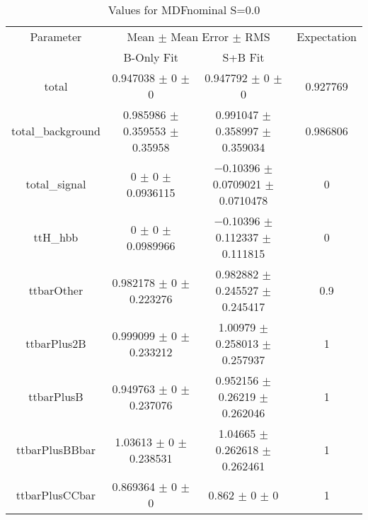 \begin{table}
\centering
\caption{Values for MDFnominal S=0.0}
\begin{tabular}{cccc}
\toprule
Parameter & \multicolumn{2}{c}{Mean $\pm$ Mean Error $\pm$ RMS} & Expectation\\
 & B-Only Fit & S+B Fit & \\
\midrule
total & \num{0.947038} $\pm$ \num{0} $\pm$ \num{0} & \num{0.947792} $\pm$ \num{0} $\pm$ \num{0} & \num{0.927769}\\
total\_background & \num{0.985986} $\pm$ \num{0.359553} $\pm$ \num{0.35958} & \num{0.991047} $\pm$ \num{0.358997} $\pm$ \num{0.359034} & \num{0.986806}\\
total\_signal & \num{0} $\pm$ \num{0} $\pm$ \num{0.0936115} & \num{-0.10396} $\pm$ \num{0.0709021} $\pm$ \num{0.0710478} & \num{0}\\
ttH\_hbb & \num{0} $\pm$ \num{0} $\pm$ \num{0.0989966} & \num{-0.10396} $\pm$ \num{0.112337} $\pm$ \num{0.111815} & \num{0}\\
ttbarOther & \num{0.982178} $\pm$ \num{0} $\pm$ \num{0.223276} & \num{0.982882} $\pm$ \num{0.245527} $\pm$ \num{0.245417} & \num{0.9}\\
ttbarPlus2B & \num{0.999099} $\pm$ \num{0} $\pm$ \num{0.233212} & \num{1.00979} $\pm$ \num{0.258013} $\pm$ \num{0.257937} & \num{1}\\
ttbarPlusB & \num{0.949763} $\pm$ \num{0} $\pm$ \num{0.237076} & \num{0.952156} $\pm$ \num{0.26219} $\pm$ \num{0.262046} & \num{1}\\
ttbarPlusBBbar & \num{1.03613} $\pm$ \num{0} $\pm$ \num{0.238531} & \num{1.04665} $\pm$ \num{0.262618} $\pm$ \num{0.262461} & \num{1}\\
ttbarPlusCCbar & \num{0.869364} $\pm$ \num{0} $\pm$ \num{0} & \num{0.862} $\pm$ \num{0} $\pm$ \num{0} & \num{1}\\
\bottomrule
\end{tabular}
\end{table}